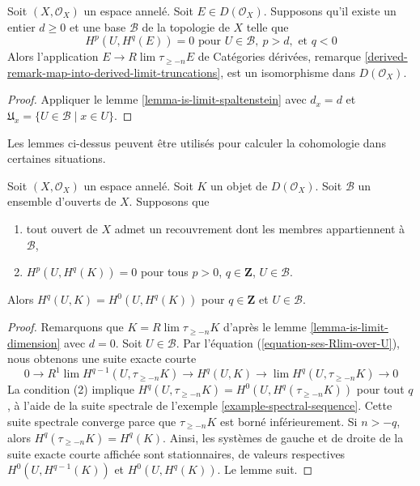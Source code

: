 {\begin{lemma}

\label{lemma-is-limit-dimension}
Soit $(X, \mathcal{O}_X)$ un espace annelé. Soit $E \in D(\mathcal{O}_X)$. Supposons qu'il existe un entier $d \geq 0$ et une base $\mathcal{B}$ de la topologie de $X$ telle que $$
H^p(U, H^q(E)) = 0 \text{ pour }
U \in \mathcal{B},\ p > d, \text{ et }q < 0
$$ Alors l'application $E \to R\lim \tau_{\geq -n} E$ de Catégories dérivées, remarque \ref{derived-remark-map-into-derived-limit-truncations}, est un isomorphisme dans $D(\mathcal{O}_X)$.
\end{lemma}

\begin{proof}
Appliquer le lemme \ref{lemma-is-limit-spaltenstein} avec $d_x = d$ et $\mathfrak{U}_x = \{U \in \mathcal{B} \mid x \in U\}$.
\end{proof}

\noindent
Les lemmes ci-dessus peuvent être utilisés pour calculer la cohomologie dans certaines situations.

\begin{lemma}

\label{lemma-cohomology-over-U-trivial}

Soit $(X, \mathcal{O}_X)$ un espace annelé. Soit $K$
un objet de $D(\mathcal{O}_X)$. Soit $\mathcal{B}$ un ensemble d'ouverts de $X$. Supposons que

\begin{enumerate}

\item tout ouvert de $X$ admet un recouvrement dont les membres appartiennent à $\mathcal{B}$,
\item  $H^p(U, H^q(K)) = 0$ pour tous $p > 0$, $q \in \mathbf{Z}$,
$U \in \mathcal{B}$.

\end{enumerate}

Alors $H^q(U, K) = H^0(U, H^q(K))$ pour $q \in \mathbf{Z}$
et $U \in \mathcal{B}$.

\end{lemma}

\begin{proof}

Remarquons que $K = R\lim \tau_{\geq -n} K$ d'après le lemme \ref{lemma-is-limit-dimension} avec $d = 0$. Soit $U \in \mathcal{B}$. Par l'équation (\ref{equation-ses-Rlim-over-U}), nous obtenons une suite exacte courte
$$
0 \to R^1\lim H^{q - 1}(U, \tau_{\geq -n}K) \to
H^q(U, K) \to \lim H^q(U, \tau_{\geq -n}K) \to 0
$$
La condition (2) implique
$H^q(U, \tau_{\geq -n} K) = H^0(U, H^q(\tau_{\geq -n} K))$
pour tout $q$, à l'aide de la suite spectrale de l'exemple \ref{example-spectral-sequence}. Cette suite spectrale converge parce que $\tau_{\geq -n}K$ est borné inférieurement. Si $n > -q$, alors $H^q(\tau_{\geq -n}K) = H^q(K)$. Ainsi, les systèmes de gauche et de droite de la suite exacte courte affichée sont stationnaires, de valeurs respectives
$H^0(U, H^{q - 1}(K))$ et $H^0(U, H^q(K))$. Le lemme suit.


\end{proof}}
